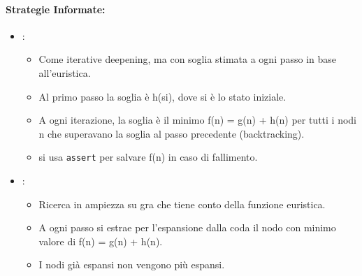 \paragraph{Strategie Informate:}

\begin{itemize}
  \item {}:
    \begin{itemize}
      \item Come iterative deepening, ma con soglia stimata a ogni
passo in base all’euristica. 
\item Al primo passo la soglia è h(si), dove si è lo stato iniziale. 
\item A ogni iterazione, la soglia è il minimo f(n) = g(n) +
h(n) per tutti i nodi n che superavano la soglia al passo
precedente (backtracking). 
\item si usa \texttt{assert} per salvare f(n) in caso di fallimento.
    \end{itemize}
  \item {}: 
    \begin{itemize}
      \item Ricerca in ampiezza su gra che tiene conto della
funzione euristica. 
      \item A ogni passo si estrae per l’espansione dalla coda il
nodo con minimo valore di f(n) = g(n) + h(n). 
\item I nodi già espansi non vengono più espansi.
    \end{itemize} 
\end{itemize}





